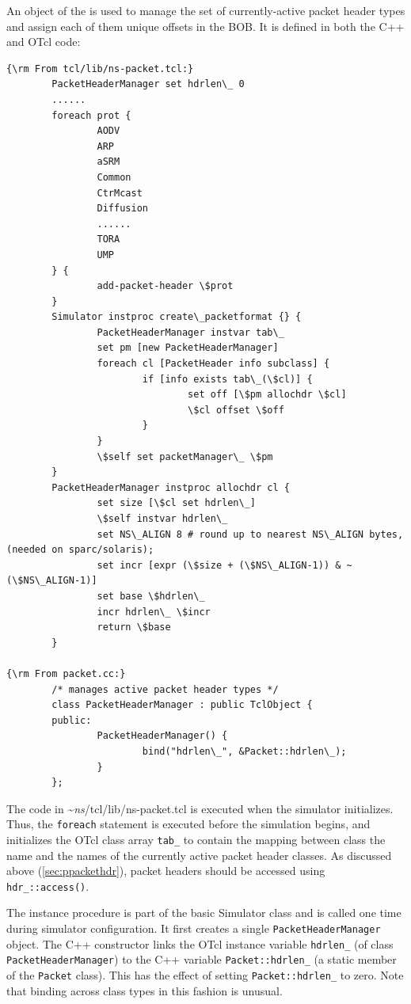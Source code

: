 An object of the  is used
to manage the set of currently-active packet header types and
assign each of them unique offsets in the BOB.
It is defined in both the C++ and OTcl code:
\begin{verbatim}
{\rm From tcl/lib/ns-packet.tcl:}
        PacketHeaderManager set hdrlen\_ 0
        ......
        foreach prot {
                AODV
                ARP
                aSRM 
                Common 
                CtrMcast 
                Diffusion
                ......
                TORA
                UMP 
        } {
                add-packet-header \$prot
        }
        Simulator instproc create\_packetformat {} {
                PacketHeaderManager instvar tab\_
                set pm [new PacketHeaderManager]
                foreach cl [PacketHeader info subclass] {
                        if [info exists tab\_(\$cl)] {
                                set off [\$pm allochdr \$cl]
                                \$cl offset \$off
                        }
                }
                \$self set packetManager\_ \$pm
        }
        PacketHeaderManager instproc allochdr cl {
                set size [\$cl set hdrlen\_]
                \$self instvar hdrlen\_
                set NS\_ALIGN 8 # round up to nearest NS\_ALIGN bytes, (needed on sparc/solaris);
                set incr [expr (\$size + (\$NS\_ALIGN-1)) & ~(\$NS\_ALIGN-1)]
                set base \$hdrlen\_
                incr hdrlen\_ \$incr
                return \$base
        }

{\rm From packet.cc:}
        /* manages active packet header types */
        class PacketHeaderManager : public TclObject {
        public:
                PacketHeaderManager() {
                        bind("hdrlen\_", &Packet::hdrlen\_);
                }
        };
\end{verbatim} %
The code in \textasciitilde\emph{ns}/{tcl/lib/ns-packet.tcl} is executed
when the simulator initializes.
Thus, the {\tt foreach} statement is executed before the
simulation begins, and initializes the OTcl class array
{\tt tab\_} to contain the mapping between class
the name and the names of the currently active packet header classes.
As discussed above (\ref{sec:ppackethdr}), packet headers should
be accessed using {\tt hdr\_::access()}. 

The  instance procedure is part of the
basic Simulator class and is called one time during simulator
configuration.
It first creates a single {\tt PacketHeaderManager} object.
The C++ constructor links the OTcl instance
variable {\tt hdrlen\_} (of class {\tt PacketHeaderManager})
to the C++ variable {\tt Packet::hdrlen\_} (a static
member of the {\tt Packet} class).
This has the effect of setting {\tt Packet::hdrlen\_} to
zero.
Note that binding across class types in this fashion is
unusual.

